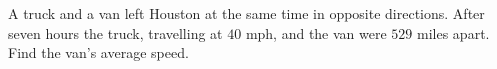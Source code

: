 A truck and a van left Houston at the same time in opposite directions. After seven hours the truck, travelling at $40$ mph, and the van were $529$ miles apart. Find the van's average speed.
